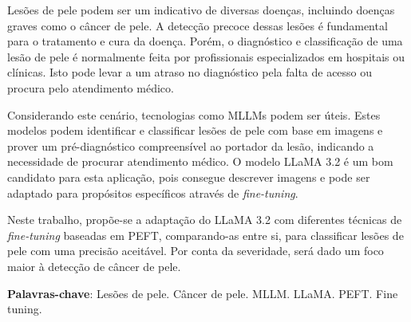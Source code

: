 \imprimircapa

\imprimirfolhaderosto*

\begin{fichacatalografica}
	
\end{fichacatalografica}



% 

\setlength{\absparsep}{18pt}
\begin{resumo}
	\SingleSpacing
	Lesões de pele podem ser um indicativo de diversas doenças, incluindo doenças graves como o câncer de pele. A detecção precoce dessas lesões é fundamental para o
	tratamento e cura da doença. Porém, o diagnóstico e classificação de uma lesão de pele é normalmente feita por profissionais especializados em hospitais ou clínicas.
	Isto pode levar a um atraso no diagnóstico pela falta de acesso ou procura pelo atendimento médico.

	Considerando este cenário, tecnologias como \acp{MLLM} podem ser úteis. Estes modelos podem identificar e classificar lesões de pele com base em imagens e prover um
	pré-diagnóstico compreensível ao portador da lesão, indicando a necessidade de procurar atendimento médico. O modelo \ac{LLaMA 3.2} é um bom candidato para esta
	aplicação, pois consegue descrever imagens e pode ser adaptado para propósitos específicos através de \textit{fine-tuning}.

	Neste trabalho, propõe-se a adaptação do \ac{LLaMA 3.2} com diferentes técnicas de \textit{fine-tuning} baseadas em \ac{PEFT}, comparando-as entre si, para
	classificar lesões de pele com uma precisão aceitável. Por conta da severidade, será dado um foco maior à detecção de câncer de pele.

	\textbf{Palavras-chave}: Lesões de pele. Câncer de pele. MLLM. LLaMA. PEFT. Fine tuning.
\end{resumo}

